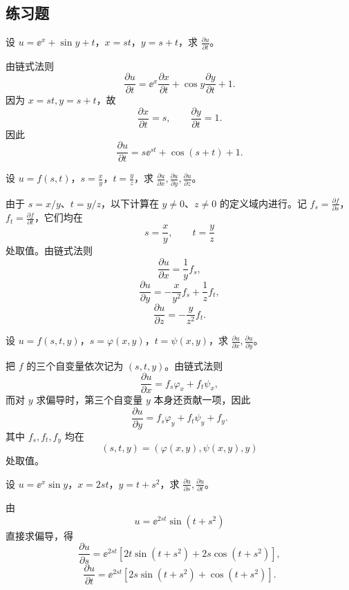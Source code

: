 \subsection{练习题}

\begin{xexercise}[1]
设 $u=\ee^x+\sin y+t$，$x=st$，$y=s+t$，求 $\frac{\partial u}{\partial t}$。
\end{xexercise}
\begin{xsolution}
由链式法则
\[
  \frac{\partial u}{\partial t}
  =\ee^x\frac{\partial x}{\partial t}
   +\cos y\frac{\partial y}{\partial t}+1.
\]
因为 $x=st,y=s+t$，故
\[
  \frac{\partial x}{\partial t}=s,
  \qquad
  \frac{\partial y}{\partial t}=1.
\]
因此
\[
  \boxed{\frac{\partial u}{\partial t}
  =s\ee^{st}+\cos(s+t)+1}.
\]
\end{xsolution}


\begin{xexercise}[2]
设 $u=f(s,t)$，$s=\frac{x}{y}$，$t=\frac{y}{z}$，求 $\frac{\partial u}{\partial x},\frac{\partial u}{\partial y},\frac{\partial u}{\partial z}$。
\end{xexercise}
\begin{xsolution}
由于 $s=x/y$、$t=y/z$，以下计算在 $y\ne0$、$z\ne0$ 的定义域内进行。记 $f_s=\frac{\partial f}{\partial s}$，$f_t=\frac{\partial f}{\partial t}$，它们均在
\[
  s=\frac xy,
  \qquad
  t=\frac yz
\]
处取值。由链式法则
\[
  \boxed{\frac{\partial u}{\partial x}=\frac1y f_s},
\]
\[
  \boxed{\frac{\partial u}{\partial y}
  =-\frac{x}{y^2}f_s+\frac1z f_t},
\]
\[
  \boxed{\frac{\partial u}{\partial z}
  =-\frac{y}{z^2}f_t}.
\]
\end{xsolution}


\begin{xexercise}[3]
设 $u=f(s,t,y)$，$s=\varphi(x,y)$，$t=\psi(x,y)$，求 $\frac{\partial u}{\partial x},\frac{\partial u}{\partial y}$。
\end{xexercise}
\begin{xsolution}
把 $f$ 的三个自变量依次记为 $(s,t,y)$。由链式法则
\[
  \boxed{
  \frac{\partial u}{\partial x}
  =f_s\varphi_x+f_t\psi_x},
\]
而对 $y$ 求偏导时，第三个自变量 $y$ 本身还贡献一项，因此
\[
  \boxed{
  \frac{\partial u}{\partial y}
  =f_s\varphi_y+f_t\psi_y+f_y}.
\]
其中 $f_s,f_t,f_y$ 均在
\[
  (s,t,y)=(\varphi(x,y),\psi(x,y),y)
\]
处取值。
\end{xsolution}


\begin{xexercise}[4]
设 $u=\ee^x\sin y$，$x=2st$，$y=t+s^2$，求 $\frac{\partial u}{\partial s},\frac{\partial u}{\partial t}$。
\end{xexercise}
\begin{xsolution}
由
\[
  u=\ee^{2st}\sin(t+s^2)
\]
直接求偏导，得
\[
  \boxed{
  \frac{\partial u}{\partial s}
  =\ee^{2st}\left[2t\sin(t+s^2)+2s\cos(t+s^2)\right]},
\]
\[
  \boxed{
  \frac{\partial u}{\partial t}
  =\ee^{2st}\left[2s\sin(t+s^2)+\cos(t+s^2)\right]}.
\]
\end{xsolution}



